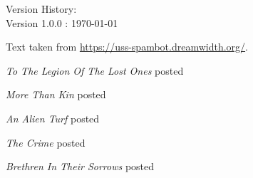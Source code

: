 \begin{center}

{\Large Version History:}\\[\baselineskip]

\vspace*{\fill}
Version 1.0.0 : \today

\majorchange

Text taken from \url{https://uss-spambot.dreamwidth.org/}.

\scenechange

\textit{To The Legion Of The Lost Ones} posted 

\textit{More Than Kin} posted 

\textit{An Alien Turf} posted 

\textit{The Crime} posted 

\textit{Brethren In Their Sorrows} posted  
\end{center}